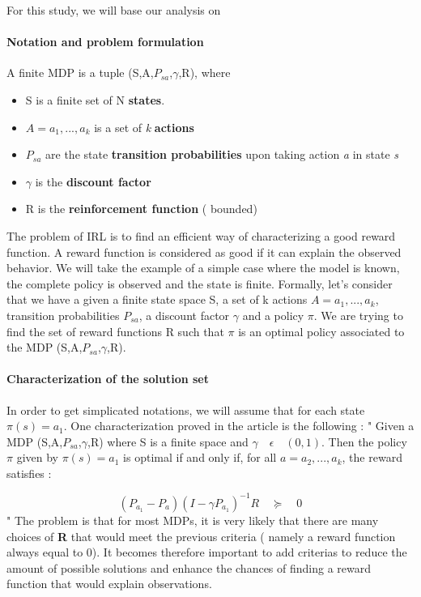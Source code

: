\documentclass{article}
\begin{document}
For this study, we will base our analysis on \cite{Ng00}
\paragraph{Notation and problem formulation }

A finite MDP is a tuple (S,A,$P_{sa}$,$\gamma$,R), where \\
\begin{itemize}
    \item S is a finite set of N \textbf{states}.
    \item $A={a_{1},...,a_{k}}$ is a set of \textit{k} \textbf{actions} 
    \item $P_{sa}$ are the state \textbf{transition probabilities} upon taking action \textit{a} in state \textit{s}
    \item $\gamma$ is the \textbf{discount factor}
    \item R is the \textbf{reinforcement function} ( bounded) 
\end{itemize}

The problem of IRL is to find an efficient way of characterizing a good reward function. A reward function is considered as good if it can explain the observed behavior.
We will take the example of a simple case where the model is known, the complete policy is observed and the state is finite. 
Formally, let's consider that we have a given a finite state space S, a set of k actions $A={a_{1},...,a_{k}}$, transition probabilities $P_{sa}$, a discount factor $\gamma$ and a policy $\pi$.
We are trying to find the set of reward functions R such that $\pi$ is an optimal policy associated to the MDP  (S,A,$P_{sa}$,$\gamma$,R).

\paragraph{Characterization of the solution set }

In order to get simplicated notations, we will assume that for each state $\pi( s) = a_{1} $. 
One characterization proved in the article is the following : 
"
Given a MDP  (S,A,$P_{sa}$,$\gamma$,R) where S is a finite space and $\gamma \quad \epsilon \quad (0,1)$. Then the policy $\pi$ given by $ \pi(s)=a_{1}$ is optimal if and only if, for all $a=a_{2},...,a_{k}$, the reward satisfies :

$$
({ P }_{ a_{ 1 } }-{ P }_{ a }){ (I-\gamma { P }_{ { a }_{ 1 } }) }^{ -1 }R\quad \succeq \quad 0
$$
"
The problem is that for most MDPs, it is very likely that there are many choices of \textbf{R} that would meet the previous criteria ( namely a reward function always equal to 0). It becomes therefore important to add criterias to reduce the amount of possible solutions and enhance the chances of finding a reward function that would explain observations.
\end{document}
